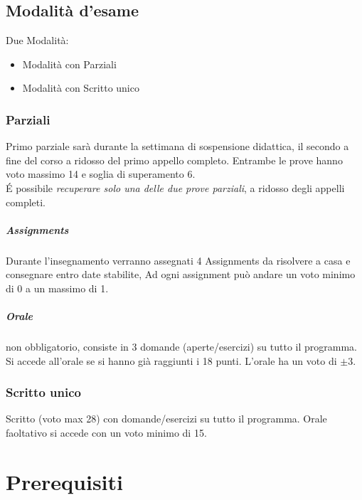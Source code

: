 \documentclass[12pt, a4paper, openany]{book}
\begin{document}
\section{Modalità d'esame}
Due Modalità:
\begin{itemize}
    \item Modalità con Parziali
    \item Modalità con Scritto unico
\end{itemize}

\subsection*{Parziali}
Primo parziale sarà durante la settimana di sospensione didattica, il secondo a fine del corso a ridosso del primo appello completo.
Entrambe le prove hanno voto massimo 14 e soglia di superamento 6.
\\É possibile \emph{recuperare solo una delle due prove parziali}, a ridosso degli appelli completi.
\paragraph*{Assignments} Durante l'insegnamento verranno assegnati 4 Assignments da risolvere a casa e consegnare entro date stabilite,
Ad ogni assignment può andare un voto minimo di 0 a un massimo di 1.
\paragraph*{Orale} non obbligatorio, consiste in 3 domande (aperte/esercizi) su tutto il programma.
Si accede all'orale se si hanno già raggiunti i 18 punti. L'orale ha un voto di $\pm 3$.

\subsection*{Scritto unico}
Scritto (voto max 28) con domande/esercizi su tutto il programma.
Orale faoltativo si accede con un voto minimo di 15.



\chapter{Prerequisiti}
\end{document}
